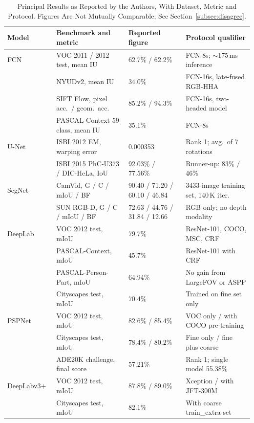 \documentclass[journal]{IEEEtran}
\begin{document}
\begin{table}[!t]
\renewcommand{\arraystretch}{1.3}
\caption{Principal Results as Reported by the Authors, With Dataset, Metric and Protocol. Figures Are Not Mutually Comparable; See Section~\ref{subsec:disagree}.}
\label{tab:results}
\centering
\begin{tabular}{|l|l|l|l|}
\hline
\textbf{Model} & \textbf{Benchmark and metric} & \textbf{Reported figure} & \textbf{Protocol qualifier}\\
\hline
FCN~\cite{long2014fully} & VOC 2011 / 2012 test, mean IU & 62.7\% / 62.2\% & FCN-8s; $\sim$175\,ms inference\\
 & NYUDv2, mean IU & 34.0\% & FCN-16s, late-fused RGB-HHA\\
 & SIFT Flow, pixel acc.\ / geom.\ acc. & 85.2\% / 94.3\% & FCN-16s, two-headed model\\
 & PASCAL-Context 59-class, mean IU & 35.1\% & FCN-8s\\
\hline
U-Net~\cite{ronneberger2015unet} & ISBI 2012 EM, warping error & 0.000353 & Rank 1; avg.\ of 7 rotations\\
 & ISBI 2015 PhC-U373 / DIC-HeLa, IoU & 92.03\% / 77.56\% & Runner-up: 83\% / 46\%\\
\hline
SegNet~\cite{badrinarayanan2015segnet} & CamVid, G / C / mIoU / BF & 90.40 / 71.20 / 60.10 / 46.84 & 3433-image training set, 140\,K iter.\\
 & SUN RGB-D, G / C / mIoU / BF & 72.63 / 44.76 / 31.84 / 12.66 & RGB only; no depth modality\\
\hline
DeepLab~\cite{chen2016deeplab} & VOC 2012 test, mIoU & 79.7\% & ResNet-101, COCO, MSC, CRF\\
 & PASCAL-Context, mIoU & 45.7\% & ResNet-101 with CRF\\
 & PASCAL-Person-Part, mIoU & 64.94\% & No gain from LargeFOV or ASPP\\
 & Cityscapes test, mIoU & 70.4\% & Trained on fine set only\\
\hline
PSPNet~\cite{zhao2016pspnet} & VOC 2012 test, mIoU & 82.6\% / 85.4\% & VOC only / with COCO pre-training\\
 & Cityscapes test, mIoU & 78.4\% / 80.2\% & Fine only / fine plus coarse\\
 & ADE20K challenge, final score & 57.21\% & Rank 1; single model 55.38\%\\
\hline
DeepLabv3+~\cite{chen2018encoderdecoder} & VOC 2012 test, mIoU & 87.8\% / 89.0\% & Xception / with JFT-300M\\
 & Cityscapes test, mIoU & 82.1\% & With coarse train\_extra set\\
\hline
\end{tabular}
\end{table}
\end{document}
